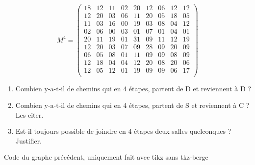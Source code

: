 \begin{enumerate}
\[M^4 = 
\begin{pmatrix}
18  &   12  &   11  &   02  &   20  &   12  & 06    & 12    & 12\\
12  &   20  &   03  &   06  &   11  &   20  & 05    & 18    & 05\\
11  &   03  &   16  &   00  &   19  &   03  & 08    & 04    & 12\\
02  &   06  &   00  &   03  &   01  &   07  & 01    & 04    & 01\\
20  &   11  &   19  &   01  &   31  &   09  & 11    & 12    & 19\\
12  &   20  &   03  &   07  &   09  &   28  & 09    & 20    & 09\\
06  &   05  &   08  &   01  &   11  &   09  & 09    & 08    & 09\\
12  &   18  &   04  &   04  &   12  &   20  & 08    & 20    & 06\\
12  &   05  &   12  &   01  &   19  &   09  & 09    & 06    & 17\\
\end{pmatrix}\]

   \begin{enumerate} 
   \item Combien y-a-t-il de chemins qui en 4 étapes, partent de D et reviennent à D ?
   \item Combien y-a-t-il de chemins qui en 4 étapes, partent de S et reviennent à C ? Les citer.
   \item Est-il toujours possible de joindre en 4 étapes deux salles quelconques ? Justifier.
   \end{enumerate}
\end{enumerate}

\vfill\newpage
Code du graphe précédent, uniquement fait avec tikz sans tkz-berge

\bigskip
\begin{tkzexample}
\end{tkzexample}


